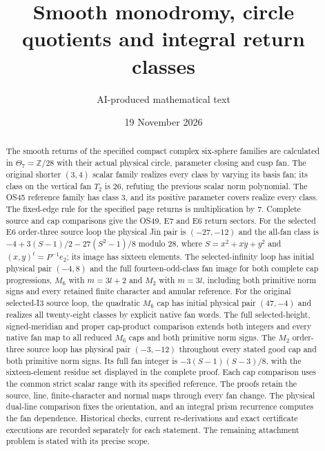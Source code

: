 

\title{Smooth monodromy, circle quotients and integral return classes}
\author{AI-produced mathematical text}
\date{19 November 2026}
\maketitle

\begin{abstract}
The smooth returns of the specified compact complex six-sphere
families are calculated in $\Theta_7=\mathbb Z/28$ with their actual
physical circle, parameter closing and cusp fan. The original
shorter $(3,4)$ scalar family realizes every class by varying its
basis fan; its class on the vertical fan $T_2$ is $26$, refuting the
previous scalar norm polynomial. The OS45 reference family has
class $3$, and its positive parameter covers realize every class.
The fixed-edge rule for the specified page returns is multiplication
by $7$. Complete source and cap comparisons give the OS49, E7 and
E6 return sectors. For the selected E6 order-three source loop the
physical Jin pair is $(-27,-12)$ and the all-fan class is
$-4+3(S-1)/2-27(S^2-1)/8$ modulo $28$, where
$S=x^2+xy+y^2$ and $(x,y)^t=P^{-1}e_2$; its image has sixteen elements.
The selected-infinity loop has initial physical pair $(-4,8)$ and
the full fourteen-odd-class fan image for both complete cap
progressions, $M_6$ with $m=3l+2$ and $M_2$ with $m=3l$,
including both primitive norm signs and every retained finite
character and annular reference.
For the original selected-I3 source loop, the quadratic $M_6$
cap has initial physical pair $(47,-4)$ and realizes all
twenty-eight classes by explicit native fan words. The full
selected-height, signed-meridian and proper cap-product comparison
extends both integers and every native fan map to all reduced
$M_6$ caps and both primitive norm signs. The $M_2$
order-three source loop has physical pair $(-3,-12)$ throughout
every stated good cap and both primitive norm signs. Its full
fan integer is $-3(S-1)(S-3)/8$, with the sixteen-element
residue set displayed in the complete proof. Each cap comparison
uses the common strict scalar range with its specified reference.
The proofs retain the source, line, finite-character and normal maps
through every fan change. The physical dual-line comparison fixes
the orientation, and an integral prism recurrence computes the fan
dependence. Historical checks, current re-derivations and exact
certificate executions are recorded separately for each statement.
The remaining attachment problem is stated with its precise scope.
\end{abstract}
